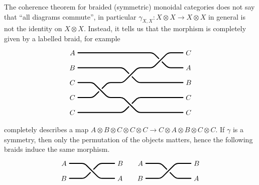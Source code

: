 \documentclass[a4paper,11pt,oneside,openany]{scrbook}
\begin{document}
\begin{rmk}
    The coherence theorem for braided (symmetric) monoidal categories does not say that ``all diagrams commute'', in particular $\gamma_{X,X}\colon X\otimes X\rightarrow X\otimes X$ in general is not the identity on $X\otimes X$. Instead, it tells us that the morphism is completely given by a labelled braid, for example
    \[
    \begin{tikzpicture}
    \draw[line width=0.5mm, cap=round, rounded corners] (0,3) -- node[pos=0, left] {$A$} (3.75,3) -- (4.5,2.25) -- (5.25,2.25) node[pos=1, right] {$A$}; %
    \draw[line width=0.5mm, cap=round, rounded corners] (0,2.25) -- node[pos=0, left] {$B$} (2.25,2.25) -- (3,1.5) -- (5.25,1.5) node[pos=1, right] {$B$}; %
    \draw[line width=2mm, cap=round, rounded corners, color=white] (0,.75) -- (.75,.75) -- (1.5,1.5) -- (2.25,1.5) -- (3,2.25) -- (3.75,2.25) -- (4.5,3) -- (5.25,3) ; %
    \draw[line width=0.5mm, cap=round, rounded corners] (0,.75) -- node[pos=0, left] {$C$} (.75,.75) -- (1.5,1.5) -- (2.25,1.5) -- (3,2.25) -- (3.75,2.25) -- (4.5,3) -- (5.25,3) node[pos=1, right] {$C$}; %
    \draw[line width=0.5mm, cap=round, rounded corners] (0,0) -- node[pos=0, left] {$C$} (2.25,0) -- (3,.75) -- (5.25,.75) node[pos=1, right] {$C$}; %
    \draw[line width=2mm, cap=round, rounded corners, color=white] (0,1.5) -- (.75,1.5) -- (1.5,.75) -- (2.25,.75) -- (3,0) -- (5.25,0); %
    \draw[line width=0.5mm, cap=round, rounded corners] (0,1.5) -- node[pos=0, left] {$C$} (.75,1.5) -- (1.5,.75) -- (2.25,.75) -- (3,0) -- (5.25,0) node[pos=1, right] {$C$}; %
    \end{tikzpicture}
    \]
    completely describes a map $A\otimes B\otimes C\otimes C\otimes C\rightarrow C\otimes A\otimes B\otimes C\otimes C$. If $\gamma$ is a symmetry, then only the permutation of the objects matters, hence the following braids induce the same morphism.
    \[
    \begin{tikzpicture}
    \draw[line width=0.5mm, cap=round, rounded corners] (0,0) -- node[pos=0, left] {$B$} (.75,0) -- (1.5,.75) -- (2.25,.75) node[pos=1, right] {$B$}; %
    \draw[line width=2mm, cap=round, rounded corners, color=white] (0,.75) -- node[pos=0, left] {$A$} (.75,.75) -- (1.5,0) -- (2.25,0) node[pos=1, right] {$A$}; %
    \draw[line width=0.5mm, cap=round, rounded corners] (0,.75) -- node[pos=0, left] {$A$} (.75,.75) -- (1.5,0) -- (2.25,0) node[pos=1, right] {$A$}; %
    \end{tikzpicture}
    \quad
    \begin{tikzpicture}
    \draw[line width=0.5mm, cap=round, rounded corners] (0,.75) -- node[pos=0, left] {$A$} (.75,.75) -- (1.5,0) -- (2.25,0) node[pos=1, right] {$A$}; %
    \draw[line width=2mm, cap=round, rounded corners, color=white] (0,0) -- node[pos=0, left] {$B$} (.75,0) -- (1.5,.75) -- (2.25,.75) node[pos=1, right] {$B$}; %
    \draw[line width=0.5mm, cap=round, rounded corners] (0,0) -- node[pos=0, left] {$B$} (.75,0) -- (1.5,.75) -- (2.25,.75) node[pos=1, right] {$B$}; %
    \end{tikzpicture}
    \]
\end{rmk}
\end{document}
